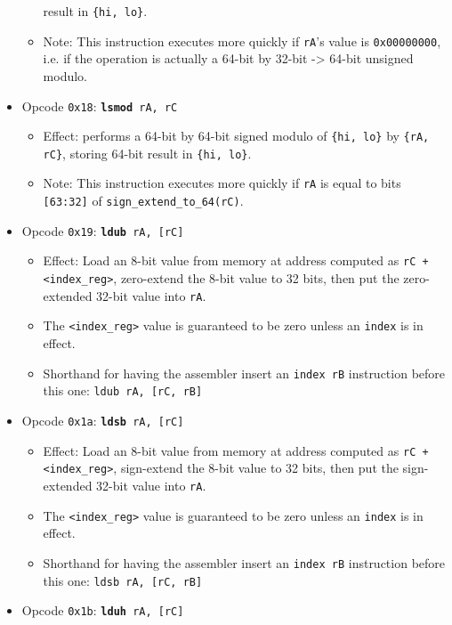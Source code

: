 \documentclass{article}
\begin{document}
\begin{itemize}
\begin{itemize}
			result in \texttt{\{hi, lo\}}.
			\item Note:  This instruction executes more quickly if
			\texttt{rA}'s value is \texttt{0x00000000}, i.e. if the
			operation is actually a 64-bit by 32-bit -> 64-bit unsigned
			modulo.
		\end{itemize}
		\item Opcode \texttt{0x18}:
			\texttt{\textbf{lsmod} rA, rC}
		\begin{itemize}
			\item Effect:  performs a 64-bit by 64-bit signed modulo of
			\texttt{\{hi, lo\}} by \texttt{\{rA, rC\}}, storing 64-bit
			result in \texttt{\{hi, lo\}}.
			\item Note:  This instruction executes more quickly if
			\texttt{rA} is equal to bits \texttt{[63:32]} of
			\texttt{sign\_extend\_to\_64(rC)}.
		\end{itemize}
		\item Opcode \texttt{0x19}:
			\texttt{\textbf{ldub} rA, [rC]}
		\begin{itemize}
			\item Effect:  Load an 8-bit value from memory at address
			computed as \texttt{rC + <index\_reg>}, zero-extend
			the 8-bit value to 32 bits, then put the zero-extended 32-bit
			value into \texttt{rA}.
			\item The \texttt{<index\_reg>} value is guaranteed to be zero
			unless an \texttt{index} is in effect.
			\item Shorthand for having the assembler insert an
			\texttt{index rB} instruction before this one:
				\texttt{ldub rA, [rC, rB]}
		\end{itemize}
		\item Opcode \texttt{0x1a}:
			\texttt{\textbf{ldsb} rA, [rC]}
		\begin{itemize}
			\item Effect:  Load an 8-bit value from memory at address
			computed as \texttt{rC + <index\_reg>}, sign-extend
			the 8-bit value to 32 bits, then put the sign-extended 32-bit
			value into \texttt{rA}.
			\item The \texttt{<index\_reg>} value is guaranteed to be zero
			unless an \texttt{index} is in effect.
			\item Shorthand for having the assembler insert an
			\texttt{index rB} instruction before this one:
				\texttt{ldsb rA, [rC, rB]}
		\end{itemize}
		\item Opcode \texttt{0x1b}:
			\texttt{\textbf{lduh} rA, [rC]}

\end{itemize}
\end{document}
